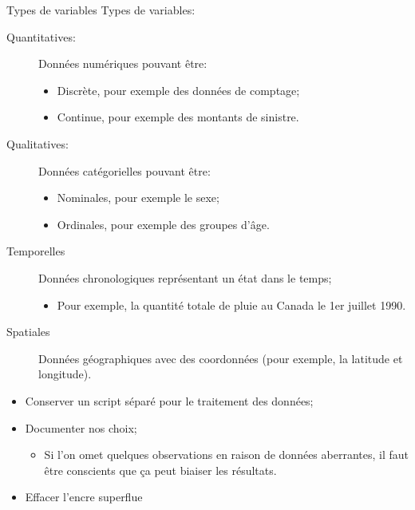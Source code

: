 \documentclass[10pt, french]{article}
\begin{document}
\begin{multicols*}{3}
\begin{conceptgen}{Types de variables}
Types de variables:
\begin{description}
	\item[Quantitatives:]	Données numériques pouvant être:
		\begin{itemize}
		\item	Discrète, pour exemple des données de comptage; 
		\item	Continue, pour exemple des montants de sinistre.
		\end{itemize}
	\item[Qualitatives:]	Données catégorielles pouvant être:
		\begin{itemize}
		\item	Nominales, pour exemple le sexe; 
		\item	Ordinales, pour exemple des groupes d'âge.
		\end{itemize}
	\item[Temporelles]Données chronologiques représentant un état dans le temps;
		\begin{itemize}
		\item	Pour exemple, la quantité totale de pluie au Canada le 1er juillet 1990.
		\end{itemize}
	\item[Spatiales]	Données géographiques avec des coordonnées (pour exemple, la latitude et longitude).
\end{description}
\end{conceptgen}

\begin{algo2}[Conseils]
\begin{itemize}
	\item	Conserver un script séparé pour le traitement des données;
	\item	Documenter nos choix;
		\begin{itemize}
		\item	Si l'on omet quelques observations en raison de données aberrantes, il faut être conscients que ça peut biaiser les résultats.
		\end{itemize}
	\item	Effacer l'encre superflue 
	

\end{itemize}
\end{algo2}
\end{multicols*}
\end{document}
